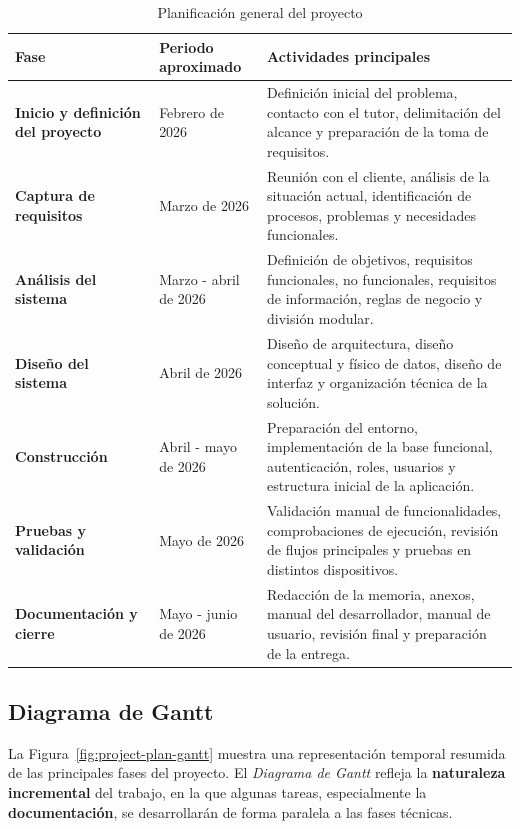\begin{table}[htbp]
    \centering
    \small
    \caption{Planificación general del proyecto}
    \label{tab:project-plan-schedule}
    \begin{tabularx}{\textwidth}{|L{3.5cm}|L{2.8cm}|Y|}
        \hline
        \textbf{Fase} & \textbf{Periodo aproximado} & \textbf{Actividades principales} \\
        \hline
        \textbf{Inicio y definición del proyecto} & Febrero de 2026 & Definición inicial del problema, contacto con el tutor, delimitación del alcance y preparación de la toma de requisitos. \\
        \hline
        \textbf{Captura de requisitos} & Marzo de 2026 & Reunión con el cliente, análisis de la situación actual, identificación de procesos, problemas y necesidades funcionales. \\
        \hline
        \textbf{Análisis del sistema} & Marzo - abril de 2026 & Definición de objetivos, requisitos funcionales, no funcionales, requisitos de información, reglas de negocio y división modular. \\
        \hline
        \textbf{Diseño del sistema} & Abril de 2026 & Diseño de arquitectura, diseño conceptual y físico de datos, diseño de interfaz y organización técnica de la solución. \\
        \hline
        \textbf{Construcción} & Abril - mayo de 2026 & Preparación del entorno, implementación de la base funcional, autenticación, roles, usuarios y estructura inicial de la aplicación. \\
        \hline
        \textbf{Pruebas y validación} & Mayo de 2026 & Validación manual de funcionalidades, comprobaciones de ejecución, revisión de flujos principales y pruebas en distintos dispositivos. \\
        \hline
        \textbf{Documentación y cierre} & Mayo - junio de 2026 & Redacción de la memoria, anexos, manual del desarrollador, manual de usuario, revisión final y preparación de la entrega. \\
        \hline
    \end{tabularx}
\end{table}
\subsection{Diagrama de Gantt}

La Figura~\ref{fig:project-plan-gantt} muestra una representación temporal resumida de las principales fases del proyecto. El \textit{Diagrama de Gantt} refleja la \textbf{naturaleza incremental} del trabajo, en la que algunas tareas, especialmente la \textbf{documentación}, se desarrollarán de forma paralela a las fases técnicas.

